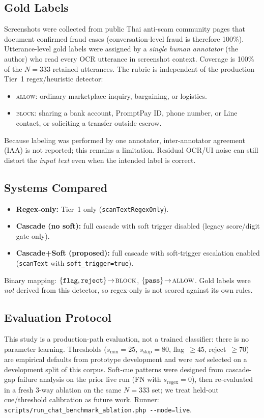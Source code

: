 \documentclass[conference]{IEEEtran}
\begin{document}
\subsection{Gold Labels}
Screenshots were collected from public Thai anti-scam community pages that
document confirmed fraud cases (conversation-level fraud is therefore 100\%).
Utterance-level gold labels were assigned by a \emph{single human annotator}
(the author) who read every OCR utterance in screenshot context. Coverage is
100\% of the $N{=}333$ retained utterances. The rubric is independent of the
production Tier~1 regex/heuristic detector:
\begin{itemize}
  \item \textsc{allow}: ordinary marketplace inquiry, bargaining, or logistics.
  \item \textsc{block}: sharing a bank account, PromptPay ID, phone number, or
        Line contact, or soliciting a transfer outside escrow.
\end{itemize}
Because labeling was performed by one annotator, inter-annotator agreement (IAA)
is not reported; this remains a limitation. Residual OCR/UI noise can still
distort the \emph{input text} even when the intended label is correct.

\subsection{Systems Compared}
\begin{itemize}
  \item \textbf{Regex-only:} Tier~1 only
        (\texttt{scanTextRegexOnly}).
  \item \textbf{Cascade (no soft):} full cascade with soft trigger disabled
        (legacy score/digit gate only).
  \item \textbf{Cascade+Soft (proposed):} full cascade with soft-trigger
        escalation enabled (\texttt{scanText} with
        \texttt{soft\_trigger=true}).
\end{itemize}
Binary mapping: $\{\texttt{flag},\texttt{reject}\}\!\rightarrow\!\textsc{block}$,
$\{\texttt{pass}\}\!\rightarrow\!\textsc{allow}$. Gold labels were \emph{not}
derived from this detector, so regex-only is not scored against its own rules.

\subsection{Evaluation Protocol}
\label{sec:eval-protocol}
This study is a production-path evaluation, not a trained classifier: there is
no parameter learning. Thresholds
($s_{\min}{=}25$, $s_{\mathrm{skip}}{=}80$, flag~$\geq 45$, reject~$\geq 70$)
are empirical defaults from prototype development and were \emph{not} selected
on a development split of this corpus. Soft-cue patterns were designed from
cascade-gap failure analysis on the prior live run (FN with
$s_{\mathrm{regex}}{=}0$), then re-evaluated in a fresh 3-way ablation on the
same $N{=}333$ set; we treat held-out cue/threshold calibration as future work.
Runner: \texttt{scripts/run\_chat\_benchmark\_ablation.php -{}-mode=live}.
\end{document}
